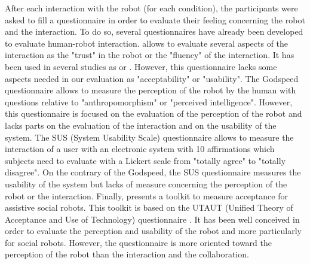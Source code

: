 \documentclass[english,a4paper,11pt,twoside]{StyleThese}
\begin{document}
After each interaction with the robot (for each condition), the participants were asked to fill a questionnaire in order to evaluate their feeling concerning the robot and the interaction. To do so, several questionnaires have already been developed to evaluate human-robot interaction. \cite{hoffman2013evaluating} allows to evaluate several aspects of the interaction as the "trust" in the robot or the "fluency" of the interaction. It has been used in several studies as \cite{gombolay2015decision} or \cite{dragan2015effects}. However, this questionnaire lacks some aspects needed in our evaluation as "acceptability" or "usability". The Godspeed questionnaire \cite{bartneck2009measurement} allows to measure the perception of the robot by the human with questions relative to "anthropomorphism" or "perceived intelligence". However, this questionnaire is focused on the evaluation of the perception of the robot and lacks parts on the evaluation of the interaction and on the usability of the system. The SUS (System Usability Scale) questionnaire \cite{brooke1986system} allows to measure the interaction of a user with an electronic system with 10 affirmations which subjects need to evaluate with a Lickert scale from "totally agree" to "totally disagree". On the contrary of the Godspeed, the SUS questionnaire measures the usability of the system but lacks of measure concerning the perception of the robot or the interaction. Finally, \cite{heerink2009measuring} presents a toolkit to measure acceptance for assistive social robots. This toolkit is based on the UTAUT (Unified Theory of Acceptance and Use of Technology) questionnaire \cite{venkatesh2003user}. It has been well conceived in order to evaluate the perception and usability of the robot and more particularly for social robots. However, the questionnaire is more oriented toward the perception of the robot than the interaction and the collaboration. 
\end{document}
